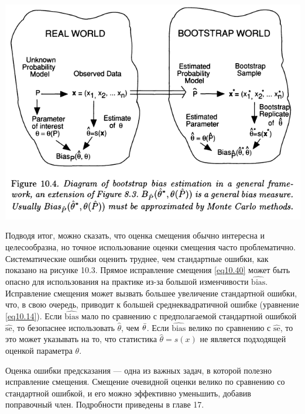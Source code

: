 \noindent
\includegraphics[width=\linewidth]{10/f10.4.png}
\newline

Подводя итог, можно сказать, что оценка смещения обычно интересна и целесообразна, но точное использование оценки смещения часто проблематично. Систематические ошибки оценить труднее, чем стандартные ошибки, как показано на рисунке 10.3. Прямое исправление смещения \ref{eq10.40} может быть опасно для использования на практике из-за большой изменчивости $\widehat{\text{bias}}$. Исправление смещения может вызвать большее увеличение стандартной ошибки, что, в свою очередь, приводит к большей среднеквадратичной ошибке (уравнение \ref{eq10.14}). Если $\widehat{\text{bias}}$ мало по сравнению с предполагаемой стандартной ошибкой $\widehat{\text{se}}$, то безопаснее использовать $\hat{\theta}$, чем $\Bar{\theta}$. Если $\widehat{\text{bias}}$ велико по сравнению с $\widehat{\text{se}}$, то это может указывать на то, что статистика $\hat{\theta} = s(x)$ не является подходящей оценкой параметра $\theta$.

Оценка ошибки предсказания --- одна из важных задач, в которой полезно исправление смещения. Смещение очевидной оценки велико по сравнению со стандартной ошибкой, и его можно эффективно уменьшить, добавив поправочный член. Подробности приведены в главе 17.
